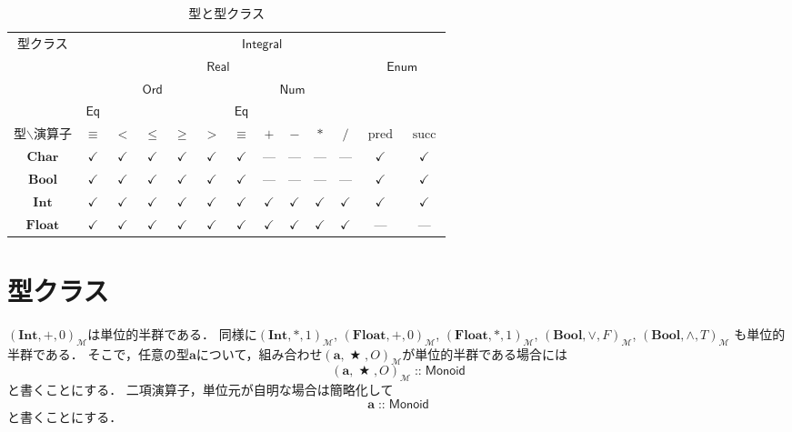 \documentclass[twocolumn]{jsbook}
\newcommand{\hsklType}[1]{\textbf{#1}}
\newcommand{\hsklTypeclass}[1]{\mathsf{#1}}
\DeclareMathOperator{\hsklPred}{pred}
\DeclareMathOperator{\hsklSucc}{succ}
\newcommand{\hsklBool}{\hsklType{Bool}}
\newcommand{\hsklEnum}{\hsklTypeclass{Enum}}
\newcommand{\hsklInt}{\hsklType{Int}}
\newcommand{\hsklIntegral}{\hsklTypeclass{Integral}}
\newcommand{\hsklEq}{\hsklTypeclass{Eq}}
\newcommand{\hsklFloat}{\hsklType{Float}}
\newcommand{\hsklMonoid}{\hsklTypeclass{Monoid}}
\newcommand{\hsklNum}{\hsklTypeclass{Num}}
\newcommand{\hsklOrd}{\hsklTypeclass{Ord}}
\newcommand{\hsklReal}{\hsklTypeclass{Real}}
\DeclareMathOperator{\mathAnyBinaryOperator}{\bigstar}
\DeclareMathOperator{\mathIn}{::}
\newcommand{\mathMonoid}[3]{(#1,#2,#3)_\mathcal{M}}
\newcommand{\typename}[1]{\mathbf{#1}}
\newcommand{\typebool}{\typename{Bool}}
\newcommand{\typechar}{\typename{Char}}
\newcommand{\typeint}{\typename{Int}}
\newcommand{\typefloat}{\typename{Float}}
\begin{document}
\begin{table*}
\caption{型と型クラス}
\label{tab:type-and-typeclass}
\begin{center}
\begin{tabular}{||c||c|c|c|c|c|c|c|c|c|c|c|c||}
\hline
\multirow{4}{*}{型クラス}
    &\multicolumn{12}{|c||}{$\hsklIntegral$}\\
\cline{2-13}
\multirow{3}{*}{}
    &\multicolumn{10}{|c|}{$\hsklReal$}
    &\multicolumn{2}{|c||}{$\hsklEnum$}\\
\cline{2-11}
\multirow{2}{*}{}
    &\multicolumn{5}{|c|}{$\hsklOrd$}
    &\multicolumn{5}{|c|}{$\hsklNum$}
    &\multicolumn{2}{|c||}{ }\\
\cline{2-2}\cline{7-7}
{ }
    &$\hsklEq$
    &\multicolumn{4}{|c|}{ }
    &$\hsklEq$
    &\multicolumn{4}{|c|}{ }
    &\multicolumn{2}{|c||}{ }\\
\hline\hline
型$\backslash$演算子
    &$\equiv$
    &$<$
    &$\le$
    &$\ge$
    &$>$
    &$\equiv$
    &$+$
    &$-$
    &$*$
    &$/$
    &$\hsklPred$
    &$\hsklSucc$\\
\hline
$\typechar$
    &$\checkmark$
    &$\checkmark$
    &$\checkmark$
    &$\checkmark$
    &$\checkmark$
    &$\checkmark$
    &---
    &---
    &---
    &---
    &$\checkmark$
    &$\checkmark$\\
\hline
$\typebool$
    &$\checkmark$
    &$\checkmark$
    &$\checkmark$
    &$\checkmark$
    &$\checkmark$
    &$\checkmark$
    &---
    &---
    &---
    &---
    &$\checkmark$
    &$\checkmark$\\
\hline
$\typeint$
    &$\checkmark$
    &$\checkmark$
    &$\checkmark$
    &$\checkmark$
    &$\checkmark$
    &$\checkmark$
    &$\checkmark$
    &$\checkmark$
    &$\checkmark$
    &$\checkmark$
    &$\checkmark$
    &$\checkmark$\\
\hline
$\typefloat$
    &$\checkmark$
    &$\checkmark$
    &$\checkmark$
    &$\checkmark$
    &$\checkmark$
    &$\checkmark$
    &$\checkmark$
    &$\checkmark$
    &$\checkmark$
    &$\checkmark$
    &---
    &---\\
\hline
\end{tabular}
\end{center}
\end{table*}

\section{型クラス}

$\mathMonoid{\hsklInt}{+}{0}$は単位的半群である．
同様に$\mathMonoid{\hsklInt}{*}{1}$, $\mathMonoid{\hsklFloat}{+}{0}$, $\mathMonoid{\hsklFloat}{*}{1}$, $\mathMonoid{\hsklBool}{\vee}{F}$, $\mathMonoid{\hsklBool}{\wedge}{T}$ も単位的半群である．
そこで，任意の型$\hsklType{a}$について，組み合わせ$\mathMonoid{\hsklType{a}}{\mathAnyBinaryOperator}{O}$が単位的半群である場合には$$\mathMonoid{\hsklType{a}}{\mathAnyBinaryOperator}{O}\mathIn\hsklMonoid$$と書くことにする．
二項演算子，単位元が自明な場合は簡略化して$$\hsklType{a}\mathIn\hsklMonoid$$と書くことにする．
\end{document}
